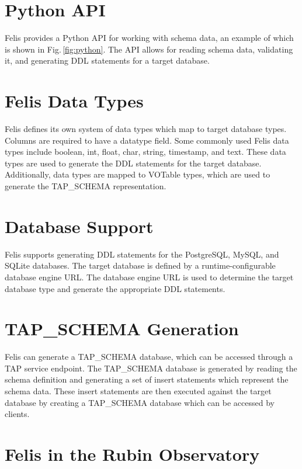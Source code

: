 \documentclass[11pt,twoside]{article}
\begin{document}
\section{Python API}


Felis provides a Python API for working with schema data, an example of which is shown in Fig.\,\ref{fig:python}.
The API allows for reading schema data, validating it, and generating DDL statements for a target database.

\section{Felis Data Types}

Felis defines its own system of data types which map to target database types.
Columns are required to have a datatype field.
Some commonly used Felis data types include boolean, int, float, char, string, timestamp, and text.
These data types are used to generate the DDL statements for the target database.
Additionally, data types are mapped to VOTable types, which are used to generate the TAP\_SCHEMA representation.

\section{Database Support}

Felis supports generating DDL statements for the PostgreSQL, MySQL, and SQLite databases.
The target database is defined by a runtime-configurable database engine URL.
The database engine URL is used to determine the target database type and generate the appropriate DDL statements.

\section{TAP\_SCHEMA Generation}

Felis can generate a TAP\_SCHEMA database, which can be accessed through a TAP service endpoint.
The TAP\_SCHEMA database is generated by reading the schema definition and generating a set of insert statements which represent the schema data.
These insert statements are then executed against the target database by creating a TAP\_SCHEMA database which can be accessed by clients.

\section{Felis in the Rubin Observatory}
\end{document}
